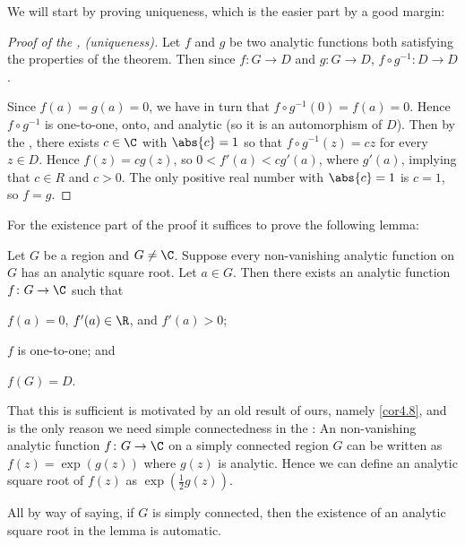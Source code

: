 


We will start by proving uniqueness, which is the easier part by a good margin:

\begin{proof}[Proof of the , (uniqueness)]
	Let $f$ and $g$ be two analytic functions both satisfying the properties of the theorem.
	Then since $f \colon G \to D$ and $g \colon G \to D$, $f \circ g^{-1} \colon D \to D$.

	Since $f(a) = g(a) = 0$, we have in turn that $f \circ g^{-1} (0) = f(a) = 0$.
	Hence $f \circ g^{-1}$ is one-to-one, onto, and analytic (so it is an automorphism of $D$).
	Then by the , there exists $c \in \C$ with $\abs{c} = 1$ so that $f \circ g^{-1}(z) = c z$ for every $z \in D$.
	Hence $f(z) = c g(z)$, so $0 < f'(a) < c g'(a)$, where $g'(a)$, implying that $c \in R$ and $c > 0$.
	The only positive real number with $\abs{c} = 1$ is $c = 1$, so $f = g$.
\end{proof}

For the existence part of the proof it suffices to prove the following lemma:

\begin{lemma}\label{lem7.18}
	Let $G$ be a region and $G \neq \C$.
	Suppose every non-vanishing analytic function on $G$ has an analytic square root.
	Let $a \in G$.
	Then there exists an analytic function $f \colon G \to \C$ such that
	\begin{items}
		\item\label{lemi} $f(a) = 0$, $f'(a) \in \R$, and $f'(a) > 0$;
		\item\label{lemii} $f$ is one-to-one; and
		\item\label{lemiii} $f(G) = D$.
	\end{items}
\end{lemma}

That this is sufficient is motivated by an old result of ours, namely \autoref{cor4.8}, and is the only reason we need simple connectedness in the :
An non-vanishing analytic function $f \colon G \to \C$ on a simply connected region $G$ can be written as $f(z) = \exp(g(z))$ where $g(z)$ is analytic.
Hence we can define an analytic square root of $f(z)$ as $\exp(\frac{1}{2} g(z))$.

All by way of saying, if $G$ is simply connected, then the existence of an analytic square root in the lemma is automatic.

